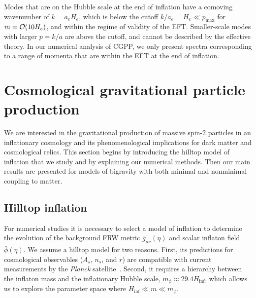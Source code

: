 \documentclass[11pt,a4paper]{article}
\begin{document}
Modes that are on the Hubble scale at the end of inflation have a comoving wavenumber of $k = a_e H_e$, which is below the cutoff $k/a_e = H_e \ll p_\mathrm{max}$ for $m = \order{10 H_e}$, and within the regime of validity of the EFT.  
Smaller-scale modes with larger $p = k/a$ are above the cutoff, and cannot be described by the effective theory.  
In our numerical analysis of CGPP, we only present spectra corresponding to a range of momenta that are within the EFT at the end of inflation.  

\section{Cosmological gravitational particle production}
\label{sec:GPP}

We are interested in the gravitational production of massive spin-2 particles in an inflationary cosmology and its phenomenological implications for dark matter and cosmological relics.  This section begins by introducing the hilltop model of inflation that we study and by explaining our numerical methods.  Then our main results are presented for models of bigravity with both minimal and nonminimal coupling to matter.  

\subsection{Hilltop inflation}
\label{sub:hilltop_inflation}

For numerical studies it is necessary to select a model of inflation to determine the evolution of the background FRW metric $\bar{g}_{\mu\nu}(\eta)$ and scalar inflaton field $\bar{\phi}(\eta)$.  We assume a hilltop model for two reasons.  First, its predictions for cosmological observables ($A_s$, $n_s$, and $r$) are compatible with current measurements by the \textit{Planck} satellite~\cite{Planck:2018vyg}.  Second, it requires a hierarchy between the inflaton mass and the inflationary Hubble scale, $m_\phi \approx 29.4 H_\mathrm{inf}$, which allows us to explore the parameter space where $H_\mathrm{inf} \ll m \ll m_\phi$.  
\end{document}
